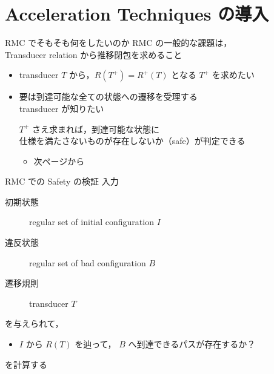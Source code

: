 \documentclass[presentation, xetex]{beamer}
\begin{document}
\section{Acceleration Techniques の導入}
\label{sec:orgcae6314}

\begin{frame}[label={sec:orgb06f3d3}]{RMC でそもそも何をしたいのか}
RMC の一般的な課題は，\\
Transducer relation から推移閉包を求めること
\begin{itemize}
\item transducer \(T\) から，\(R(T^+) = R^+(T)\) となる \(T^+\) を求めたい
\item 要は到達可能な全ての状態への遷移を受理する \\
transducer が知りたい

\(T^+\) さえ求まれば，到達可能な状態に \\
仕様を満たさないものが存在しないか（safe）が判定できる
\begin{itemize}
\item 次ページから
\end{itemize}
\end{itemize}
\end{frame}


\begin{frame}[label={sec:org1163416}]{RMC での Safety の検証}
入力
\begin{description}
\item[{初期状態}] regular set of initial configuration \(I\)
\item[{違反状態}] regular set of bad configuration \(B\)
\item[{遷移規則}] transducer \(T\)
\end{description}

を与えられて，
\begin{itemize}
\item \(I\) から \(R(T)\) を辿って，
\(B\) へ到達できるパスが存在するか？
\end{itemize}
を計算する
\end{frame}
\end{document}
